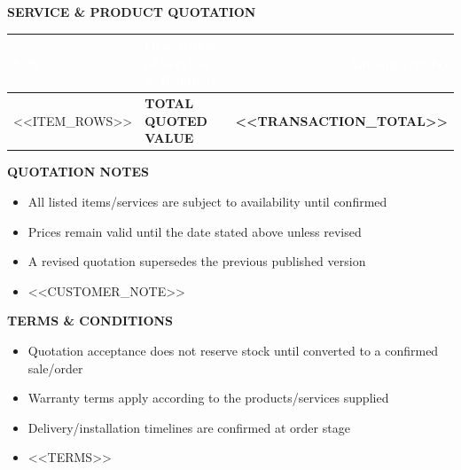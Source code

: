 \documentclass[11pt, a4paper]{article}
\begin{document}
\vspace{6mm}

{\large\textbf{\textcolor{brandblue}{SERVICE \& PRODUCT QUOTATION}}}
\vspace{2mm}

\renewcommand{\arraystretch}{1.3}
\begin{tabularx}{\textwidth}{l X r}
    \rowcolor{brandblue}
    \textbf{\textcolor{white}{S/N}} & \textbf{\textcolor{white}{Description of Services \& Products}} & \textbf{\textcolor{white}{Amount (NGN)}} \\
    \midrule
<<ITEM_ROWS>>
    \midrule
    \rowcolor{lightgray}
    & \textbf{TOTAL QUOTED VALUE} & \textbf{<<TRANSACTION_TOTAL>>} \\
    \bottomrule
\end{tabularx}

\vspace{5mm}

\noindent
\begin{minipage}[t]{0.48\textwidth}
    \textbf{\textcolor{brandblue}{QUOTATION NOTES}} \\
    \begin{itemize}[leftmargin=*, noitemsep, topsep=1pt]
        \item \small All listed items/services are subject to availability until confirmed
        \item \small Prices remain valid until the date stated above unless revised
        \item \small A revised quotation supersedes the previous published version
        \item \small <<CUSTOMER_NOTE>>
    \end{itemize}
\end{minipage}
\hfill
\begin{minipage}[t]{0.48\textwidth}
    \textbf{\textcolor{brandblue}{TERMS \& CONDITIONS}}
    \begin{itemize}[leftmargin=*, noitemsep, topsep=1pt]
        \item \small Quotation acceptance does not reserve stock until converted to a confirmed sale/order
        \item \small Warranty terms apply according to the products/services supplied
        \item \small Delivery/installation timelines are confirmed at order stage
        \item \small <<TERMS>>
    \end{itemize}
\end{minipage}
\end{document}
